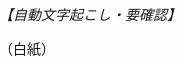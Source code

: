 \documentclass[../../main.tex]{subfiles}
\begin{document}
\begin{oframed}
  
\end{oframed}

\begin{flushright}
  \footnotesize\textit{【自動文字起こし・要確認】}
\end{flushright}

（白紙）
\end{document}
